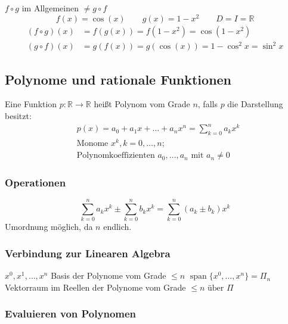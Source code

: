 \begin{note} \(f \circ g \) im Allgemeinen \( \neq g \circ f \)
	\[
			f(x) = \cos(x)\qquad g(x) = 1-x^2 \qquad D = I=\mathbb{R}
	\]
		\begin{align*}
		(f \circ g)(x) &= f(g(x)) = f(1-x^2) = \cos(1-x^2) \\
		(g \circ f)(x) &= g(f(x)) = g(\cos(x)) = 1-\cos^2x = \sin^2x
	\end{align*}
\end{note}


\subsection{Polynome und rationale Funktionen} %
\label{sub:polyFunk}

Eine Funktion \( p:\mathbb{R} \rightarrow \mathbb{R} \) heißt Polynom vom Grade $n$, falls $p$ die Darstellung besitzt:
\begin{align*}
	&p(x)=a_0+a_1x+\ldots+a_n x^n = \sum_{k=0}^{n} a_kx^k\\
	&\text{Monome }x^k, k=0,\ldots,n; \\
	&\text{Polynomkoeffizienten }a_0,\ldots,a_n \text{ mit } a_n \neq 0
\end{align*}

\subsubsection*{Operationen} %
\label{ssub:polyOp}

\[
  \sum_{k=0}^{n}  a_kx^k  \pm
  \sum_{k=0}^{n}  b_kx^k  =
  \sum_{k=0}^{n}  (a_k \pm b_k)x^k
\]
Umordnung möglich, da \( n \) endlich.

\subsubsection*{Verbindung zur Linearen Algebra} %
\label{ssub:polyLinAlg}
\( x^0,x^1,\ldots,x^n \) Basis der Polynome vom Grade \( \leq n \) \newline
\( \operatorname{span} \{x^0 ,\ldots,x^n\}=\Pi_n \) Vektorraum im Reellen der Polynome vom Grade \( \leq n \text{ über } \Pi \)


\subsubsection*{Evaluieren von Polynomen} %
\label{ssub:evaluieren_von_polynomen}

